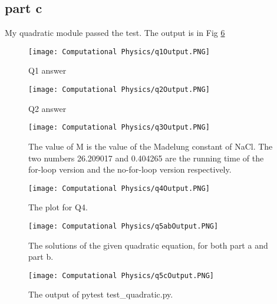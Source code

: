 \documentclass[11pt]{article}
\begin{document}
\subsection{part c}
My quadratic module passed the test. The output is in Fig \ref{fig:Q5c}


\begin{figure}[b!]
\centering
\texttt{[image: Computational Physics/q1Output.PNG]}
\caption{Q1 answer}
  \label{fig:Q1}
\end{figure}

\begin{figure}[b!]
\centering
\texttt{[image: Computational Physics/q2Output.PNG]}
\caption{Q2 answer}
  \label{fig:Q2}
\end{figure}

\begin{figure}[b!]
\centering
\texttt{[image: Computational Physics/q3Output.PNG]}
\caption{The value of M is the value of the Madelung constant of NaCl. The two numbers 26.209017 and 0.404265 are the running time of the for-loop version and the no-for-loop version respectively.}
  \label{fig:Q3}
\end{figure}

\begin{figure}[b!]
\centering
\texttt{[image: Computational Physics/q4Output.PNG]}
\caption{The plot for Q4.}
  \label{fig:Q4}
\end{figure}

\begin{figure}[b!]
\centering
\texttt{[image: Computational Physics/q5abOutput.PNG]}
\caption{The solutions of the given quadratic equation, for both part a and part b.}
  \label{fig:Q5ab}
\end{figure}

\begin{figure}[b!]
\centering
\texttt{[image: Computational Physics/q5cOutput.PNG]}
\caption{The output of pytest test\_quadratic.py.}
  \label{fig:Q5c}
\end{figure}





\end{document}
